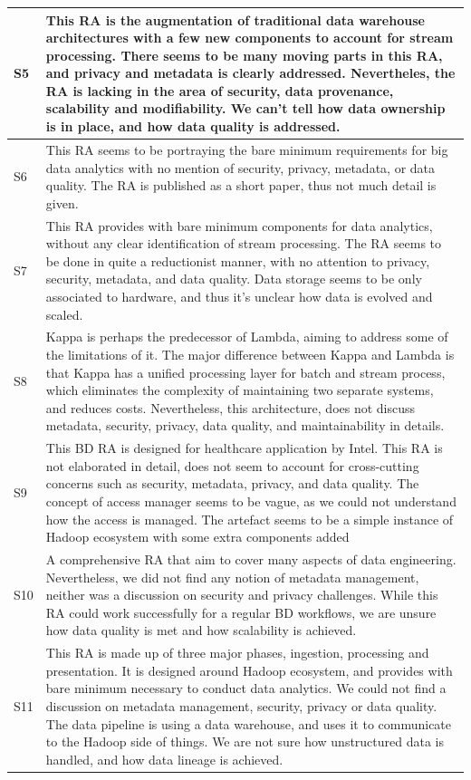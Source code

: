 \documentclass{ieeeaccess}
\begin{document}
\begin{table}
\begin{tabular}{|p{0.3cm}|p{16.8cm}|}
        \hline
        S5 & This RA is the augmentation of traditional data warehouse architectures with a few new components to account for stream processing. There seems to be many moving parts in this RA, and privacy and metadata is clearly addressed. Nevertheles, the RA is lacking in the area of security, data provenance, scalability and modifiability. We can't tell how data ownership is in place, and how data quality is addressed. \\
        \hline
        S6 & This RA seems to be portraying the bare minimum requirements for big data analytics with no mention of security, privacy, metadata, or data quality. The RA is published as a short paper, thus not much detail is given. \\
        \hline
        S7 & This RA provides with bare minimum components for data analytics, without any clear identification of stream processing. The RA seems to be done in quite a reductionist manner, with no attention to privacy, security, metadata, and data quality. Data storage seems to be only associated to hardware, and thus it's unclear how data is evolved and scaled.  \\
        \hline
        S8 & Kappa is perhaps the predecessor of Lambda, aiming to address some of the limitations of it. The major difference between Kappa and Lambda is that Kappa has a unified processing layer for batch and stream process, which eliminates the complexity of maintaining two separate systems, and reduces costs. Nevertheless, this architecture, does not discuss metadata, security, privacy, data quality, and maintainability in details.  \\
        \hline
        S9 & This BD RA is designed for healthcare application by Intel. This RA is not elaborated in detail, does not seem to account for cross-cutting concerns such as security, metadata, privacy, and data quality. The concept of access manager seems to be vague, as we could not understand how the access is managed. The artefact seems to be a simple instance of Hadoop ecosystem with some extra components added   \\
        \hline
        S10 & A comprehensive RA that aim to cover many aspects of data engineering. Nevertheless, we did not find any notion of metadata management, neither was a discussion on security and privacy challenges. While this RA could work successfully for a regular BD workflows, we are unsure how data quality is met and how scalability is achieved.  \\
        \hline
        S11 & This RA is made up of three major phases, ingestion, processing and presentation. It is designed around Hadoop ecosystem, and provides with bare minimum necessary to conduct data analytics. We could not find a discussion on metadata management, security, privacy or data quality. The data pipeline is using a data warehouse, and uses it to communicate to the Hadoop side of things. We are not sure how unstructured data is handled, and how data lineage is achieved.  \\

\end{tabular}
\end{table}
\end{document}
